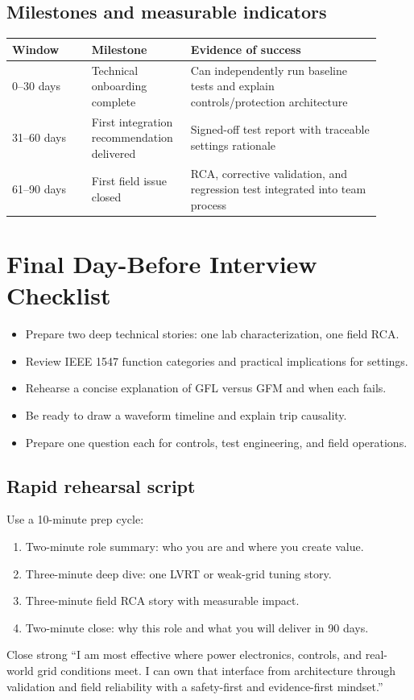 \documentclass[11pt]{article}
\begin{document}
\subsection{Milestones and measurable indicators}
\begin{table}[h]
\centering
\begin{tabular}{p{0.2\linewidth}p{0.23\linewidth}p{0.48\linewidth}}
\toprule
Window & Milestone & Evidence of success \\
\midrule
0--30 days & Technical onboarding complete & Can independently run baseline tests and explain controls/protection architecture \\
31--60 days & First integration recommendation delivered & Signed-off test report with traceable settings rationale \\
61--90 days & First field issue closed & RCA, corrective validation, and regression test integrated into team process \\
\bottomrule
\end{tabular}
\end{table}

\section{Final Day-Before Interview Checklist}

\begin{itemize}
  \item Prepare two deep technical stories: one lab characterization, one field RCA.
  \item Review IEEE 1547 function categories and practical implications for settings.
  \item Rehearse a concise explanation of GFL versus GFM and when each fails.
  \item Be ready to draw a waveform timeline and explain trip causality.
  \item Prepare one question each for controls, test engineering, and field operations.
\end{itemize}

\subsection{Rapid rehearsal script}
Use a 10-minute prep cycle:
\begin{enumerate}
  \item Two-minute role summary: who you are and where you create value.
  \item Three-minute deep dive: one LVRT or weak-grid tuning story.
  \item Three-minute field RCA story with measurable impact.
  \item Two-minute close: why this role and what you will deliver in 90 days.
\end{enumerate}

\begin{keybox}{Close strong}
``I am most effective where power electronics, controls, and real-world grid
conditions meet. I can own that interface from architecture through validation
and field reliability with a safety-first and evidence-first mindset.''
\end{keybox}
\end{document}
